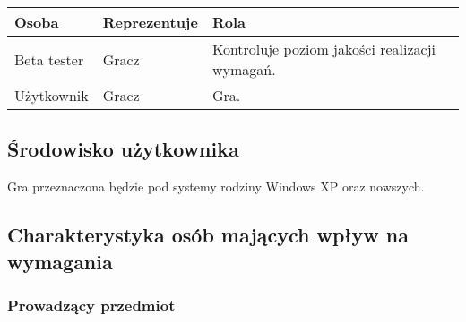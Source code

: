 \documentclass[12pt,a4paper,twoside]{article}
\begin{document}

\begin{longtable}{|p{1in}|p{2in}|p{2in}|}
\hline
{\bf Osoba} & {\bf Reprezentuje} & {\bf Rola}\\
\hline
\endhead
Beta tester &
Gracz &
Kontroluje poziom jakości realizacji wymagań.\\
\hline
Użytkownik &
Gracz &
Gra.\\
\hline
\end{longtable}

\subsection{Środowisko użytkownika}
Gra przeznaczona będzie pod systemy rodziny Windows XP oraz nowszych.








\subsection{Charakterystyka osób mających wpływ na wymagania}


\subsubsection{Prowadzący przedmiot}
\end{document}

